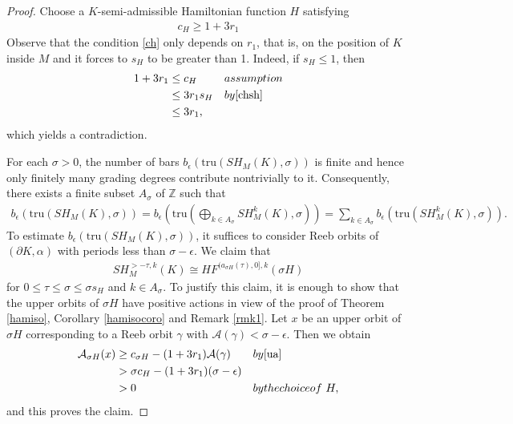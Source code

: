 \documentclass[10pt,a4paper]{amsart}
\newcommand{\ZZ}{{\mathbb Z}}
\begin{document}
\begin{proof}
Choose a $K$-semi-admissible Hamiltonian function $H$ satisfying
\begin{align}\label{ch}
    c_H \geq 1+3r_1
\end{align}
Observe that the condition \eqref{ch} only depends on $r_1$, that is, on the position of $K$ inside $M$ and it forces to $s_H$ to be greater than 1. Indeed, if $s_H \leq 1$, then
\begin{align*}
    1+3r_1 &\leq c_H &&\textrm{assumption}\\
    &\leq 3r_1 s_H &&\textrm{by \eqref{chsh}}\\
    &\leq 3r_1,
\end{align*}
which yields a contradiction.

\vspace{0.2cm}

For each $\sigma>0$, the number of bars $b_{\epsilon} \left( \textrm{tru}(SH_M(K),\sigma ) \right)$ is finite and hence only finitely many grading degrees contribute nontrivially to it. Consequently, there exists a finite subset $A_\sigma$ of $\ZZ$ such that
\begin{align*}
    b_{\epsilon} \left( \textrm{tru}(SH_M(K),\sigma ) \right) = b_{\epsilon} \left( \textrm{tru}\left(\bigoplus_{k \in A_\sigma}SH^k_M(K),\sigma \right) \right) = \sum_{k \in A_\sigma}b_{\epsilon} \left( \textrm{tru}(SH^k_M(K),\sigma ) \right).
\end{align*}
To estimate $b_{\epsilon} \left( \textrm{tru}(SH_M(K),\sigma ) \right)$, it suffices to consider Reeb orbits of $(\partial K,\alpha)$ with periods less than $\sigma - \epsilon$. We claim that
\begin{align}\label{ingiso}
     SH^{>-\tau,k}_M(K) \cong  HF^{(a_{\sigma H}(\tau),0],k}(\sigma H)
\end{align}
for $0\leq \tau\leq\sigma \leq \sigma s_H$ and $k \in A_\sigma$. To justify this claim, it is enough to show that the upper orbits of $\sigma H$ have positive actions in view of the proof of Theorem \ref{hamiso}, Corollary \ref{hamisocoro} and Remark \ref{rmk1}. Let $x$ be an upper orbit of $\sigma H$ corresponding to a Reeb orbit $\gamma$ with $\mathcal{A}(\gamma) < \sigma - \epsilon$. Then we obtain
\begin{align*}
   \mathcal{A}_{\sigma H}(x) &\geq c_{\sigma H} - (1+3r_1)\mathcal{A}(\gamma) &&\textrm{by \eqref{ua}}\\&> \sigma c_H- (1+3r_1)(\sigma -\epsilon)\\&>0 &&\textrm{by the choice of }\,\,H,
\end{align*}
and this proves the claim.


\end{proof}
\end{document}
